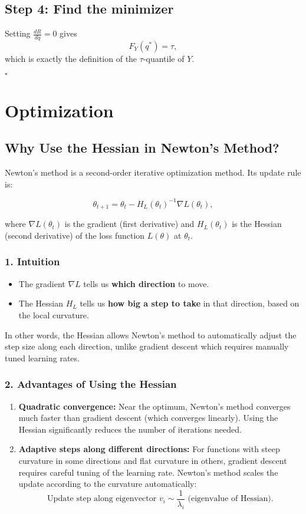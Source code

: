 \subsection*{Step 4: Find the minimizer}
Setting $\frac{dR}{dq} = 0$ gives
\[
F_Y(q^*) = \tau,
\]
which is exactly the definition of the $\tau$-quantile of $Y$.

\hfill $\square$

\section{Optimization}
\subsection{Why Use the Hessian in Newton's Method?}

Newton's method is a second-order iterative optimization method. Its update rule is:

\[
\theta_{t+1} = \theta_t - H_L(\theta_t)^{-1} \nabla L(\theta_t),
\]

where 
\(\nabla L(\theta_t)\) is the gradient (first derivative) and 
\(H_L(\theta_t)\) is the Hessian (second derivative) of the loss function \(L(\theta)\) at \(\theta_t\).

\subsubsection{1. Intuition}

\begin{itemize}
    \item The gradient \(\nabla L\) tells us \textbf{which direction} to move.
    \item The Hessian \(H_L\) tells us \textbf{how big a step to take} in that direction, based on the local curvature.
\end{itemize}

In other words, the Hessian allows Newton's method to automatically adjust the step size along each direction, unlike gradient descent which requires manually tuned learning rates.

\subsubsection*{2. Advantages of Using the Hessian}

\begin{enumerate}
    \item \textbf{Quadratic convergence:} 
    Near the optimum, Newton's method converges much faster than gradient descent (which converges linearly). Using the Hessian significantly reduces the number of iterations needed.
    
    \item \textbf{Adaptive steps along different directions:} 
    For functions with steep curvature in some directions and flat curvature in others, gradient descent requires careful tuning of the learning rate. 
    Newton's method scales the update according to the curvature automatically:
    \[
    \text{Update step along eigenvector } v_i \sim \frac{1}{\lambda_i} \text{ (eigenvalue of Hessian)}.
    \]
\end{enumerate}

